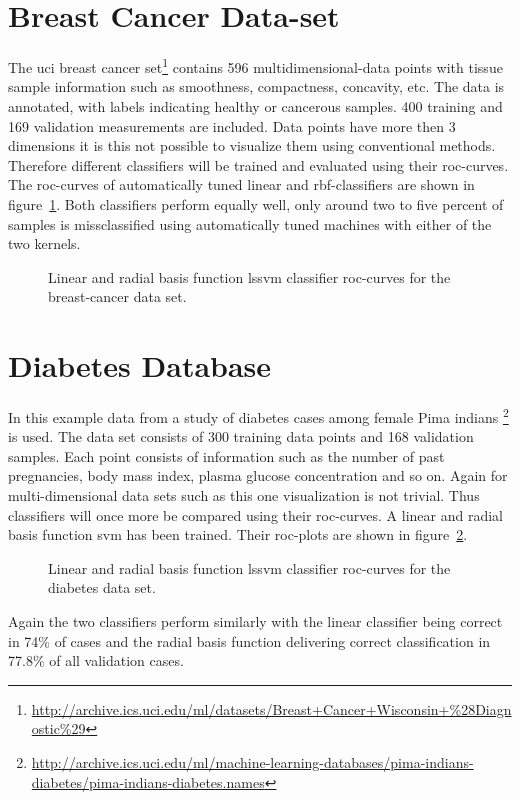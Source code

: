 \section{Breast Cancer Data-set}
The uci breast cancer set\footnote{\url{http://archive.ics.uci.edu/ml/datasets/Breast+Cancer+Wisconsin+\%28Diagnostic\%29}} contains 596 multidimensional-data points with tissue sample information such as smoothness, compactness, concavity, etc. The data is annotated, with labels indicating healthy or cancerous samples. 400 training and 169 validation measurements are included. Data points have more then 3 dimensions it is this not possible to visualize them using conventional methods. Therefore different classifiers will be trained and evaluated using their roc-curves. The roc-curves of automatically tuned linear and rbf-classifiers are shown in figure~\ref{fig:breastROC}. Both classifiers perform equally well, only around two to five percent of samples is missclassified using automatically tuned machines with either of the two kernels. 
\begin{figure}


\caption{Linear and radial basis function lssvm classifier roc-curves for the breast-cancer data set.}
\label{fig:breastROC}
\end{figure}

\section{Diabetes Database}
In this example data from a study of diabetes cases among female Pima indians \footnote{\url{http://archive.ics.uci.edu/ml/machine-learning-databases/pima-indians-diabetes/pima-indians-diabetes.names}} is used. The data set consists of 300 training data points and 168 validation samples. Each point consists of information such as the number of past pregnancies, body mass index, plasma glucose concentration and so on. 
Again for multi-dimensional data sets such as this one visualization is not trivial. Thus classifiers will once more be compared using their roc-curves. A linear and radial basis function svm has been trained. Their roc-plots are shown in figure~\ref{fig:diabetesROC}. 
\begin{figure}


\caption{Linear and radial basis function lssvm classifier roc-curves for the diabetes data set.}
\label{fig:diabetesROC}
\end{figure}
Again the two classifiers perform similarly with the linear classifier being correct in 74\% of cases and the radial basis function delivering correct classification in  77.8\% of all validation cases.  
